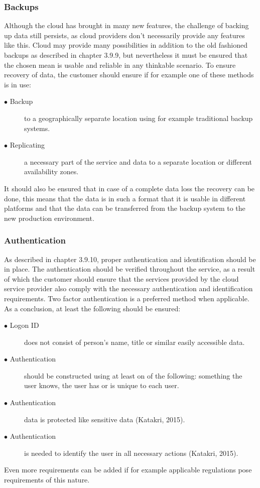 \documentclass{article}
\begin{document}
\subsubsection{Backups}
Although the cloud has brought in many new features, the challenge of backing up data still persists, as cloud providers don't necessarily provide any features like this. Cloud may provide many possibilities in addition to the old fashioned backups as described in chapter 3.9.9, but nevertheless it must be ensured that the chosen mean is usable and reliable in any thinkable scenario. To ensure recovery of data, the customer should ensure if for example one of these methods is in use:
\begin{description}
	\item[$\bullet$ Backup] to a geographically separate location using for example traditional backup systems.
	\item[$\bullet$ Replicating] a necessary part of the service and data to a separate location or different availability zones.
\end{description}
It should also be ensured that in case of a complete data loss the recovery can be done, this means that the data is in such a format that it is usable in different platforms and that the data can be transferred from the backup system to the new production environment.

\subsubsection{Authentication}
As described in chapter 3.9.10, proper authentication and identification should be in place. The authentication should be verified throughout the service, as a result of which the customer should ensure that the services provided by the cloud service provider also comply with the necessary authentication and identification requirements. Two factor authentication is a preferred method when applicable. As a conclusion, at least the following should be ensured:
\begin{description}
	\item[$\bullet$ Logon ID] does not consist of person's name, title or similar easily accessible data.
	\item[$\bullet$ Authentication] should be constructed using at least on of the following: something the user knows, the user has or is unique to each user.
	\item[$\bullet$ Authentication] data is protected like sensitive data (Katakri, 2015).
	\item[$\bullet$ Authentication] is needed to identify the user in all necessary actions (Katakri, 2015).
\end{description}
Even more requirements can be added if for example applicable regulations pose requirements of this nature.
\end{document}
